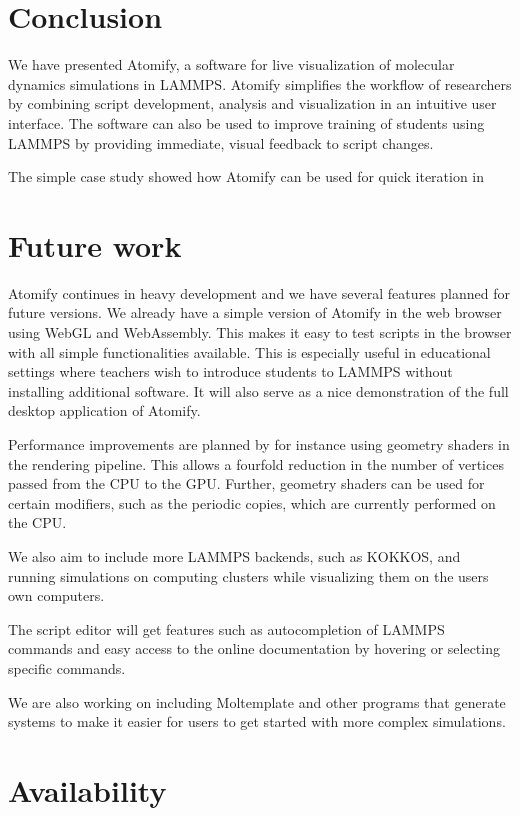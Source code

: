 \documentclass[aps,pre,twocolumn,letterpaper,floatfix,nofootinbib]{revtex4}
\begin{document}
\section{\label{sec:conclusion}Conclusion}
%
We have presented Atomify, a software for live visualization of molecular
dynamics simulations in LAMMPS.
Atomify simplifies the workflow of researchers by combining script development,
analysis and visualization in an intuitive user interface.
The software can also be used to improve training of students using LAMMPS by
providing immediate, visual feedback to script changes.

The simple case study showed how Atomify can be used for quick iteration in 

\section{\label{sec:future}Future work}

Atomify continues in heavy development and we have several features planned for
future versions.
We already have a simple version of Atomify in the web browser using WebGL and WebAssembly.
This makes it easy to test scripts in the browser with all simple functionalities available.
This is especially useful in educational settings where teachers wish to introduce students
to LAMMPS without installing additional software.
It will also serve as a nice demonstration of the full desktop application of
Atomify.

Performance improvements are planned by for instance using geometry shaders in
the rendering pipeline.
This allows a fourfold reduction in the number of vertices passed from the CPU
to the GPU.
Further, geometry shaders can be used for certain modifiers,
such as the periodic copies, which are currently performed on the CPU.

We also aim to include more LAMMPS backends, such as KOKKOS, and running
simulations on computing clusters while visualizing them on the users own
computers.

The script editor will get features such as autocompletion of LAMMPS commands
and easy access to the online documentation by hovering or selecting specific
commands.

We are also working on including Moltemplate and other programs that generate
systems to make it easier for users to get started with more complex
simulations.

\section{Availability}
\end{document}
